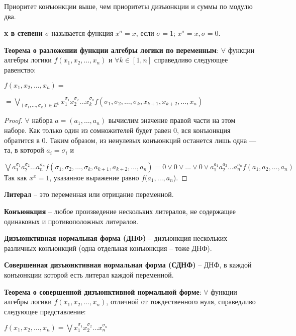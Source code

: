 Приоритет конъюнкции выше, чем приоритеты дизъюнкции и суммы по модулю два. 

\textbf{x в степени $\sigma$} называется функция $x^{\sigma} = x$, если  $\sigma = 1$; $x^{ \sigma} = \overline{x}, \sigma = 0$.

\bigbreak
\textbf{Теорема о разложении функции алгебры логики по переменным}: $\forall$ функции алгебры логики $f(x_{1}, x_{2},\ldots, x_{n})$ и $\forall k \in [1,n]$ справедливо следующее равенство:

$f(x_{1}, x_{2}, \ldots, x_{n}) = $

$ = \bigvee_{(\sigma_1,\ldots,\sigma_k)\in E^k}{x^{\sigma_{1}}_{1}  x^{\sigma_{2}}_{2}  \ldots  x^{\sigma_{k}}_{k}  f (\sigma_{1},\sigma_{2},\ldots,\sigma_{k},x_{k+1}, x_{k+2}, \ldots, x_{n})}$

\begin{proof}
$\forall$ набора $a = (a_{1}, \ldots, a_{n})$ вычислим значение правой части на этом наборе. Как только один из сомножителей будет равен 0, вся конъюнкция обратится в 0. Таким образом, из ненулевых конъюнкций останется лишь одна --- та,  в которой $a_{i} = \sigma_{i}$ и

$\bigvee a^{\sigma_{1}}_{1}  a^{\sigma_{2}}_{2}  \ldots  a^{\sigma_{n}}_{n}  f (\sigma_{1}, \sigma_{2},\ldots,\sigma_{k},a_{k+1}, a_{k+2}, \ldots, a_{n}) = 0 \vee 0 \vee \ldots \vee 0 \vee a^{a_{1}}_{1}  a^{a_{2}}_{2}  \ldots  a^{a_{n}}_{n}  f(a_{1}, a_{2},\ldots,a_{n})$ \\
Так как $x^{x} = 1$, указанное выражение равно $f(a_{1}, \ldots, a_{n}$).
\end{proof}

\textbf{Литерал} -- это переменная или отрицание переменной.

\textbf{Конъюнкция} -- любое произведение нескольких литералов, не содержащее одинаковых и противоположных литералов.

\textbf{Дизъюнктивная нормальная форма (ДНФ)} -- дизъюнкция нескольких различных конъюнкций (одна отдельная конъюнкция -- тоже ДНФ).

\textbf{Совершенная дизъюнктивная нормальная форма (СДНФ)} -- ДНФ, в каждой конъюнкции которой есть литерал каждой переменной.

\bigbreak
\textbf{Теорема о совершенной дизъюнктивной нормальной форме}: $\forall$ функции алгебры логики $f(x_{1}, x_{2}, \ldots, x_{n})$, отличной от тождественного нуля, справедливо следующее представление:

 $f(x_{1}, x_{2}, \ldots, x_{n}) = \bigvee x^{\sigma_{1}}_{1}   x^{\sigma_{2}}_{2}   \ldots   x^{\sigma_{n}}_{n}$
 
